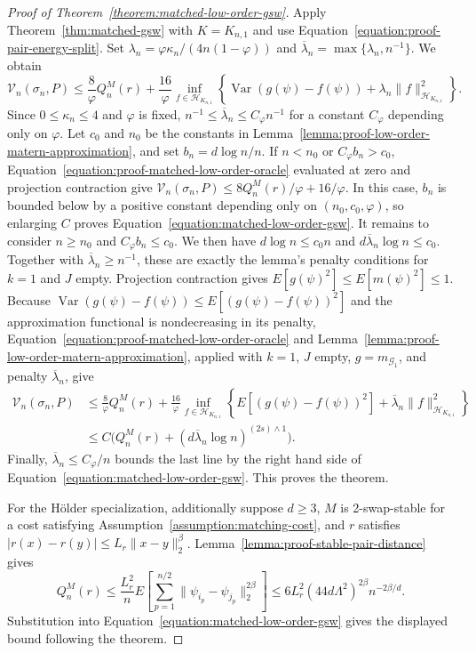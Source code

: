 \documentclass[letterpaper,12pt]{article}
\theoremstyle{definition}
\numberwithin{equation}{section}
\newcommand{\mc}{\mathcal}
\newcommand{\norm}[1]{\lVert#1\rVert}
\DeclareMathOperator{\var}{Var}
\begin{document}
\begin{proof}[Proof of Theorem~\ref{theorem:matched-low-order-gsw}]
Apply Theorem~\ref{thm:matched-gsw} with $K=K_{n,1}$ and use Equation~\eqref{equation:proof-pair-energy-split}.
Set $\lambda_n=\varphi\kappa_n/(4n(1-\varphi))$ and $\overline\lambda_n=\max\{\lambda_n,n^{-1}\}$.
We obtain
\begin{equation}\label{equation:proof-matched-low-order-oracle}
\mc V_n(\sigma_n,P)\leq\frac8\varphi Q_n^M(r)+\frac{16}\varphi\inf_{f\in\mc H_{K_{n,1}}}\left\{\var(g(\psi)-f(\psi))+\lambda_n\norm{f}_{\mc H_{K_{n,1}}}^2\right\}.
\end{equation}
Since $0\leq\kappa_n\leq4$ and $\varphi$ is fixed, $n^{-1}\leq\overline\lambda_n\leq C_\varphi n^{-1}$ for a constant $C_\varphi$ depending only on $\varphi$.
Let $c_0$ and $n_0$ be the constants in Lemma~\ref{lemma:proof-low-order-matern-approximation}, and set $b_n=d\log n/n$.
If $n<n_0$ or $C_\varphi b_n>c_0$, Equation~\eqref{equation:proof-matched-low-order-oracle} evaluated at zero and projection contraction give $\mc V_n(\sigma_n,P)\leq8Q_n^M(r)/\varphi+16/\varphi$.
In this case, $b_n$ is bounded below by a positive constant depending only on $(n_0,c_0,\varphi)$, so enlarging $C$ proves Equation~\eqref{equation:matched-low-order-gsw}.
It remains to consider $n\geq n_0$ and $C_\varphi b_n\leq c_0$.
We then have $d\log n\leq c_0n$ and $d\overline\lambda_n\log n\leq c_0$.
Together with $\overline\lambda_n\geq n^{-1}$, these are exactly the lemma's penalty conditions for $k=1$ and $J$ empty.
Projection contraction gives $E[g(\psi)^2]\leq E[m(\psi)^2]\leq1$.
Because $\var(g(\psi)-f(\psi))\leq E[(g(\psi)-f(\psi))^2]$ and the approximation functional is nondecreasing in its penalty, Equation~\eqref{equation:proof-matched-low-order-oracle} and Lemma~\ref{lemma:proof-low-order-matern-approximation}, applied with $k=1$, $J$ empty, $g=m_{\mc G_1}$, and penalty $\overline\lambda_n$, give
\begin{align*}
\mc V_n(\sigma_n,P)&\leq\frac8\varphi Q_n^M(r)+\frac{16}\varphi\inf_{f\in\mc H_{K_{n,1}}}\left\{E[(g(\psi)-f(\psi))^2]+\overline\lambda_n\norm{f}_{\mc H_{K_{n,1}}}^2\right\}\\
&\leq C\bigg(Q_n^M(r)+(d\overline\lambda_n\log n)^{(2s)\wedge1}\bigg).
\end{align*}
Finally, $\overline\lambda_n\leq C_\varphi/n$ bounds the last line by the right hand side of Equation~\eqref{equation:matched-low-order-gsw}.
This proves the theorem.

For the H\"older specialization, additionally suppose $d\geq3$, $M$ is 2-swap-stable for a cost satisfying Assumption~\ref{assumption:matching-cost}, and $r$ satisfies $|r(x)-r(y)|\leq L_r\norm{x-y}_2^\beta$.
Lemma~\ref{lemma:proof-stable-pair-distance} gives
\begin{equation}\label{equation:proof-holder-residual-energy}
Q_n^M(r)\leq\frac{L_r^2}{n}E\left[\sum_{p=1}^{n/2}\norm{\psi_{i_p}-\psi_{j_p}}_2^{2\beta}\right]\leq6L_r^2(44d\Lambda^2)^{2\beta}n^{-2\beta/d}.
\end{equation}
Substitution into Equation~\eqref{equation:matched-low-order-gsw} gives the displayed bound following the theorem.
\end{proof}
\end{document}
